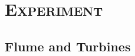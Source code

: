 \documentclass[xcolor=x11names,compress]{beamer}
\renewcommand{\(}{\begin{columns}}
\renewcommand{\)}{\end{columns}}
\newcommand{\<}[1]{\begin{column}{#1}}
\renewcommand{\>}{\end{column}}
\begin{document}
\section{\scshape Experiment}

	\subsection{Flume and Turbines}
\end{document}
